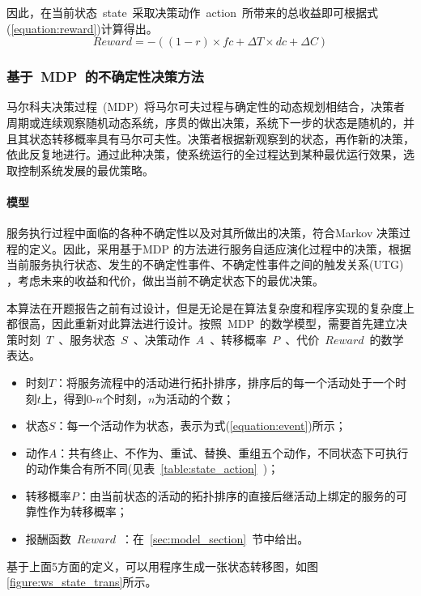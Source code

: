 因此，在当前状态~state~采取决策动作~action~所带来的总收益即可根据式(\ref{equation:reward})计算得出。
\begin{equation}\label{equation:reward}
Reward =  - ((1 - r) \times fc + \Delta T \times dc + \Delta C)
\end{equation}

\subsubsection{基于~MDP~的不确定性决策方法}

马尔科夫决策过程~(MDP)~将马尔可夫过程与确定性的动态规划相结合，决策者周期或连续观察随机动态系统，序贯的做出决策，系统下一步的状态是随机的，并且其状态转移概率具有马尔可夫性。决策者根据新观察到的状态，再作新的决策，依此反复地进行。通过此种决策，使系统运行的全过程达到某种最优运行效果，选取控制系统发展的最优策略。

\paragraph{模型}

服务执行过程中面临的各种不确定性以及对其所做出的决策，符合Markov 决策过程的定义。因此，采用基于MDP 的方法进行服务自适应演化过程中的决策，根据当前服务执行状态、发生的不确定性事件、不确定性事件之间的触发关系(UTG) ，考虑未来的收益和代价，做出当前不确定状态下的最优决策。

本算法在开题报告之前有过设计，但是无论是在算法复杂度和程序实现的复杂度上都很高，因此重新对此算法进行设计。按照~MDP~的数学模型，需要首先建立决策时刻~$T$~、服务状态~$S$~、决策动作~$A$~、转移概率~$P$~、代价~$Reward$~的数学表达。

\begin{itemize}
    \item 时刻$T$：将服务流程中的活动进行拓扑排序，排序后的每一个活动处于一个时刻$t$上，得到0-$n$个时刻，$n$为活动的个数；
    \item 状态$S$：每一个活动作为状态，表示为式(\ref{equation:event})所示；
    \item 动作$A$：共有终止、不作为、重试、替换、重组五个动作，不同状态下可执行的动作集合有所不同(见表~\ref{table:state_action}~)；
    \item 转移概率$P$：由当前状态的活动的拓扑排序的直接后继活动上绑定的服务的可靠性作为转移概率；
    \item 报酬函数~$Reward$~：在~\ref{sec:model_section}~节中给出。
\end{itemize}

基于上面5方面的定义，可以用程序生成一张状态转移图，如图\ref{figure:ws_state_trans}所示。

